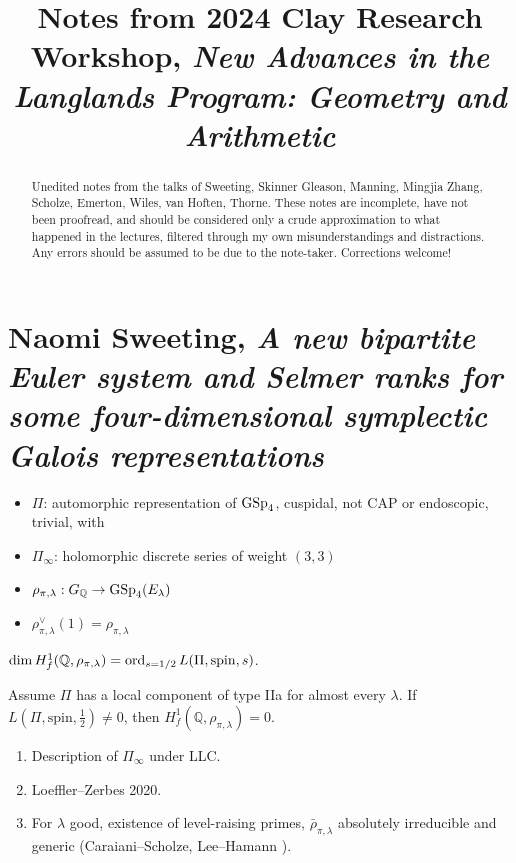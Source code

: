 \documentclass[reqno]{amsart} 
\begin{document}
\title{Notes from 2024 Clay Research Workshop, \emph{New Advances in the Langlands Program: Geometry and Arithmetic}}

\begin{abstract}
  Unedited notes from the talks of Sweeting, Skinner Gleason, Manning, Mingjia Zhang, Scholze, Emerton, Wiles, van Hoften, Thorne.  These notes are incomplete, have not been proofread, and should be considered only a crude approximation to what happened in the lectures, filtered through my own misunderstandings and distractions.  Any errors should be assumed to be due to the note-taker.  Corrections welcome!
\end{abstract}

\maketitle

\tableofcontents


\part{Naomi Sweeting, \emph{A new bipartite Euler system and Selmer ranks for some four-dimensional symplectic Galois representations}}

\begin{itemize}
\item $\Pi$: automorphic representation of $\operatorname{GSp}_{4}$, cuspidal, not CAP or endoscopic, trivial, with 
\item $\Pi_\infty$: holomorphic discrete series of weight $(3,3)$
\item $\rho_{\pi, \lambda} : G_{\mathbb{Q}} \rightarrow \operatorname{GSp}_4(E_\lambda)$
\item $\rho_{\pi, \lambda}^\vee(1) = \rho_{\pi, \lambda}$
\end{itemize}
\begin{conjecture}
  $\dim H_f^1(\mathbb{Q}, \rho_{\pi, \lambda}) = \operatorname{ord}_{s = 1/2} L(\Pi, \mathrm{spin}, s)$.
\end{conjecture}
\begin{theorem}[S.,\ TBD]\label{theorem:cnpoolw6ih}
  Assume $\Pi$ has a local component of type IIa for almost every $\lambda$.  If $L(\Pi, \mathrm{spin}, \tfrac{1}{2}) \neq 0$, then $H_f^1(\mathbb{Q}, \rho_{\pi, \lambda}) = 0$.
\end{theorem}

\begin{remark}
  \begin{enumerate}
  \item Description of $\Pi_\infty$ under LLC.
  \item Loeffler--Zerbes 2020.
  \item For $\lambda$ good, existence of level-raising primes, $\bar{\rho}_{\pi, \lambda}$ absolutely irreducible and generic (Caraiani--Scholze, Lee--Hamann \cite{2023arXiv2309.08705}).
  \end{enumerate}
\end{remark}
\end{document}
